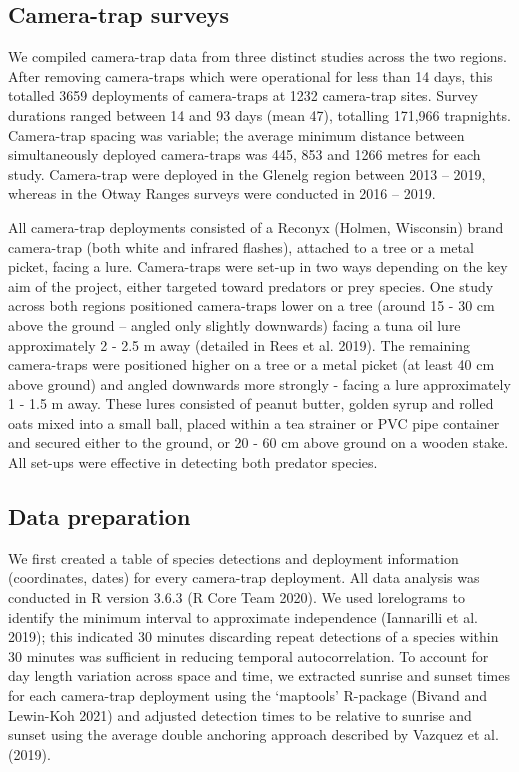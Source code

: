 \documentclass[]{elsarticle} %
\begin{document}
\hypertarget{camera-trap-surveys}{%
\subsection{Camera-trap surveys}\label{camera-trap-surveys}}

We compiled camera-trap data from three distinct studies across the two regions. After removing camera-traps which were operational for less than 14 days, this totalled 3659 deployments of camera-traps at 1232 camera-trap sites. Survey durations ranged between 14 and 93 days (mean 47), totalling 171,966 trapnights. Camera-trap spacing was variable; the average minimum distance between simultaneously deployed camera-traps was 445, 853 and 1266 metres for each study. Camera-trap were deployed in the Glenelg region between 2013 -- 2019, whereas in the Otway Ranges surveys were conducted in 2016 -- 2019.

All camera-trap deployments consisted of a Reconyx (Holmen, Wisconsin) brand camera-trap (both white and infrared flashes), attached to a tree or a metal picket, facing a lure. Camera-traps were set-up in two ways depending on the key aim of the project, either targeted toward predators or prey species. One study across both regions positioned camera-traps lower on a tree (around 15 - 30 cm above the ground -- angled only slightly downwards) facing a tuna oil lure approximately 2 - 2.5 m away (detailed in Rees et al. 2019). The remaining camera-traps were positioned higher on a tree or a metal picket (at least 40 cm above ground) and angled downwards more strongly - facing a lure approximately 1 - 1.5 m away. These lures consisted of peanut butter, golden syrup and rolled oats mixed into a small ball, placed within a tea strainer or PVC pipe container and secured either to the ground, or 20 - 60 cm above ground on a wooden stake. All set-ups were effective in detecting both predator species.

\hypertarget{data-preparation}{%
\subsection{Data preparation}\label{data-preparation}}

We first created a table of species detections and deployment information (coordinates, dates) for every camera-trap deployment. All data analysis was conducted in R version 3.6.3 (R Core Team 2020). We used lorelograms to identify the minimum interval to approximate independence (Iannarilli et al. 2019); this indicated 30 minutes discarding repeat detections of a species within 30 minutes was sufficient in reducing temporal autocorrelation. To account for day length variation across space and time, we extracted sunrise and sunset times for each camera-trap deployment using the `maptools' R-package (Bivand and Lewin-Koh 2021) and adjusted detection times to be relative to sunrise and sunset using the average double anchoring approach described by Vazquez et al. (2019).
\end{document}
